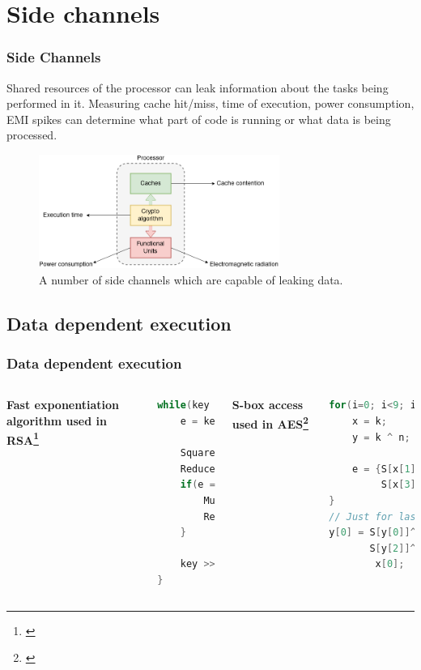 \documentclass[10pt]{beamer}
\begin{document}
\section{Side channels}

\begin{frame}
\frametitle{Side Channels}

Shared resources of the processor can leak information about the tasks being performed in it.
Measuring cache hit/miss, time of execution, power consumption, EMI spikes can
determine what part of code is running or what data is being processed.

\begin{figure}[h]
    \centering
    \includegraphics[width=0.7\textwidth]{figures/side_channel.png}
    \caption[Data leakage sources]{A number of side channels which are capable of leaking data.}
    \label{fig:dls}
\end{figure}
\end{frame}

\subsection{Data dependent execution}
\begin{frame}[fragile]
\frametitle{Data dependent execution}

\begin{columns}[t]
        \textbf{Fast exponentiation algorithm used in RSA\footnote[frame]{\cite{cache_missing}}}
        \begin{lstlisting}[language={C}]
while(key > 0) {
    e = key % 2;

    Square();
    Reduce();
    if(e == 1) {
        Multiply();
        Reduce();
    }

    key >>= 1;
}
        \end{lstlisting}
        \textbf{S-box access used in AES\footnote[frame]{\cite{bern}}}
        \begin{lstlisting}[language={C}]
for(i=0; i<9; i++) {
    x = k;
    y = k ^ n;

    e = {S[x[1]]^1, S[x[2]],
         S[x[3]], S[x[0]]};
}
// Just for last round
y[0] = S[y[0]]^S[y[1]]^
       S[y[2]]^S[y[3]]^
        x[0];
        \end{lstlisting}
\end{columns}
\end{frame}
\end{document}
